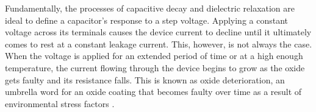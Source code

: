 Fundamentally, the processes of capacitive decay and dielectric relaxation are ideal to define a capacitor's response to a step voltage. Applying a constant voltage across its terminals causes the device current to decline until it ultimately comes to rest at a constant leakage current. This, however, is not always the case. When the voltage is applied for an extended period of time or at a high enough temperature, the current flowing through the device begins to grow as the oxide gets faulty and its resistance falls. This is known as oxide deterioration, an umbrella word for an oxide coating that becomes faulty over time as a result of environmental stress factors \cite{ghibaudo1999emerging}. \\

